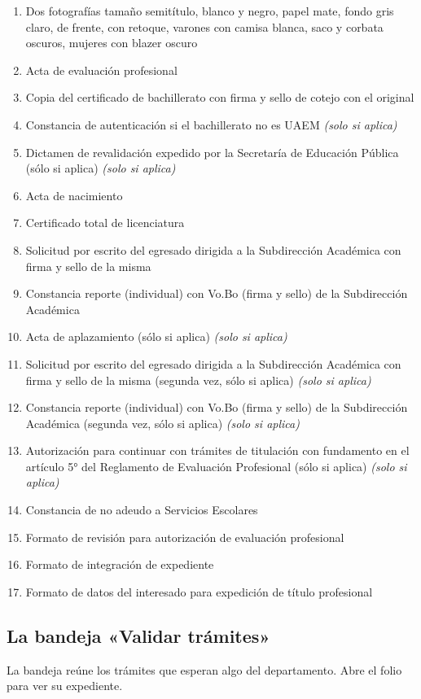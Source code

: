 \begin{enumerate}
  \item Dos fotografías tamaño semitítulo, blanco y negro, papel mate, fondo gris claro, de frente, con retoque, varones con camisa blanca, saco y corbata oscuros, mujeres con blazer oscuro
  \item Acta de evaluación profesional
  \item Copia del certificado de bachillerato con firma y sello de cotejo con el original
  \item Constancia de autenticación si el bachillerato no es UAEM \emph{(solo si aplica)}
  \item Dictamen de revalidación expedido por la Secretaría de Educación Pública (sólo si aplica) \emph{(solo si aplica)}
  \item Acta de nacimiento
  \item Certificado total de licenciatura
  \item Solicitud por escrito del egresado dirigida a la Subdirección Académica con firma y sello de la misma
  \item Constancia reporte (individual) con Vo.Bo (firma y sello) de la Subdirección Académica
  \item Acta de aplazamiento (sólo si aplica) \emph{(solo si aplica)}
  \item Solicitud por escrito del egresado dirigida a la Subdirección Académica con firma y sello de la misma (segunda vez, sólo si aplica) \emph{(solo si aplica)}
  \item Constancia reporte (individual) con Vo.Bo (firma y sello) de la Subdirección Académica (segunda vez, sólo si aplica) \emph{(solo si aplica)}
  \item Autorización para continuar con trámites de titulación con fundamento en el artículo 5° del Reglamento de Evaluación Profesional (sólo si aplica) \emph{(solo si aplica)}
  \item Constancia de no adeudo a Servicios Escolares
  \item Formato de revisión para autorización de evaluación profesional
  \item Formato de integración de expediente
  \item Formato de datos del interesado para expedición de título profesional
\end{enumerate}
\subsection{La bandeja «Validar trámites»}
La bandeja reúne los trámites que esperan algo del departamento. Abre el folio para ver su expediente.
